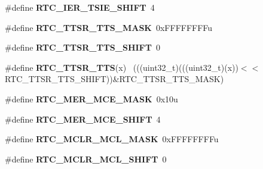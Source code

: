 \begin{DoxyCompactItemize}
\item 
\hypertarget{group___r_t_c___register___masks_ga456ec6fb31112c122b38dcc586d9e75d}{}\#define {\bfseries R\+T\+C\+\_\+\+I\+E\+R\+\_\+\+T\+S\+I\+E\+\_\+\+S\+H\+I\+F\+T}~4\label{group___r_t_c___register___masks_ga456ec6fb31112c122b38dcc586d9e75d}

\item 
\hypertarget{group___r_t_c___register___masks_gafca335e38cdf96b5338da71f0b4e2e53}{}\#define {\bfseries R\+T\+C\+\_\+\+T\+T\+S\+R\+\_\+\+T\+T\+S\+\_\+\+M\+A\+S\+K}~0x\+F\+F\+F\+F\+F\+F\+F\+Fu\label{group___r_t_c___register___masks_gafca335e38cdf96b5338da71f0b4e2e53}

\item 
\hypertarget{group___r_t_c___register___masks_gac16f77ca799c8ee0e4b8c69775f35fbf}{}\#define {\bfseries R\+T\+C\+\_\+\+T\+T\+S\+R\+\_\+\+T\+T\+S\+\_\+\+S\+H\+I\+F\+T}~0\label{group___r_t_c___register___masks_gac16f77ca799c8ee0e4b8c69775f35fbf}

\item 
\hypertarget{group___r_t_c___register___masks_gaa1c7e9a38737227e32fe24eb7584589a}{}\#define {\bfseries R\+T\+C\+\_\+\+T\+T\+S\+R\+\_\+\+T\+T\+S}(x)                                                ~(((uint32\+\_\+t)(((uint32\+\_\+t)(x))$<$$<$R\+T\+C\+\_\+\+T\+T\+S\+R\+\_\+\+T\+T\+S\+\_\+\+S\+H\+I\+F\+T))\&R\+T\+C\+\_\+\+T\+T\+S\+R\+\_\+\+T\+T\+S\+\_\+\+M\+A\+S\+K)\label{group___r_t_c___register___masks_gaa1c7e9a38737227e32fe24eb7584589a}

\item 
\hypertarget{group___r_t_c___register___masks_gafec09235402e1af7a5633d4f86082f9f}{}\#define {\bfseries R\+T\+C\+\_\+\+M\+E\+R\+\_\+\+M\+C\+E\+\_\+\+M\+A\+S\+K}~0x10u\label{group___r_t_c___register___masks_gafec09235402e1af7a5633d4f86082f9f}

\item 
\hypertarget{group___r_t_c___register___masks_ga90cc577c972ef88390b6cfda384ea255}{}\#define {\bfseries R\+T\+C\+\_\+\+M\+E\+R\+\_\+\+M\+C\+E\+\_\+\+S\+H\+I\+F\+T}~4\label{group___r_t_c___register___masks_ga90cc577c972ef88390b6cfda384ea255}

\item 
\hypertarget{group___r_t_c___register___masks_ga38ae5da3a67efa21c40e59615df7333e}{}\#define {\bfseries R\+T\+C\+\_\+\+M\+C\+L\+R\+\_\+\+M\+C\+L\+\_\+\+M\+A\+S\+K}~0x\+F\+F\+F\+F\+F\+F\+F\+Fu\label{group___r_t_c___register___masks_ga38ae5da3a67efa21c40e59615df7333e}

\item 
\hypertarget{group___r_t_c___register___masks_ga1882e75b5cd193e98d54d3814660b71e}{}\#define {\bfseries R\+T\+C\+\_\+\+M\+C\+L\+R\+\_\+\+M\+C\+L\+\_\+\+S\+H\+I\+F\+T}~0\label{group___r_t_c___register___masks_ga1882e75b5cd193e98d54d3814660b71e}


\end{DoxyCompactItemize}
